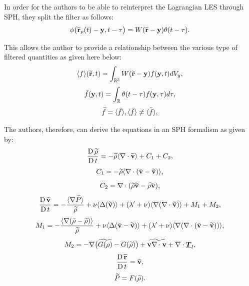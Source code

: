 In order for the authors to be able to reinterpret the Lagrangian LES through SPH, they split the filter as follows:
\begin{equation}
    \phi\big(\widetilde{\mathbf{r}}_p(t)-\mathbf{y}, t-\tau  \big) = W(\widetilde{\mathbf{r}} - \mathbf{y})\theta(t-\tau).
\end{equation}

This allows the author to provide a relationship between the various type of filtered quantities as given here below:
\begin{equation}
    \langle f \rangle(\widetilde{\mathbf{r}}, t) = \int_{\mathbb{R}^3} W ( \widetilde{\mathbf{r}} - \mathbf{y} ) f ( \mathbf{y}, t ) dV_y,
\end{equation}
\begin{equation}
    \bar{f}(\mathbf{y}, t) = \int_{\mathbb{R}} \theta(t-\tau) f(\mathbf{y}, \tau) d\tau,
\end{equation}
\begin{equation}
    \widetilde{f} = \langle \bar{f} \rangle, \langle \bar{f} \rangle \neq \bar{\langle f \rangle},
\end{equation}

The authors, therefore, can derive the equations in an SPH formalism as given by:
\begin{equation}
    \frac{\operatorname{D} \widetilde{\rho}}{\operatorname{D} t} = -\widetilde{\rho} \langle \nabla\cdot\widetilde{\mathbf{v}} \rangle + C_1 + C_2,
\end{equation}
\begin{equation}
    C_1 = -\widetilde{\rho}\langle \nabla\cdot(\bar{\mathbf{v}}-\widetilde{\mathbf{v}}) \rangle,
\end{equation}
\begin{equation}
    C_2 = \nabla\cdot(\widetilde{\rho}\widetilde{\mathbf{v}} - \widetilde{\rho\mathbf{v}}),
\end{equation}
\begin{equation}
    \frac{\operatorname{D} \widetilde{\mathbf{v}}}{\operatorname{D} t} = -\frac{\langle \nabla\widetilde{P} \rangle}{\widetilde{\rho}} + \nu\langle \Delta(\widetilde{\mathbf{v}}) \rangle + (\lambda'+\nu)\langle \nabla(\nabla\cdot\widetilde{\mathbf{v}}) \rangle + M_1 + M_2,
\end{equation}
\begin{equation}
    M_1 = -\frac{\langle \nabla(\bar{\rho}-\widetilde{\rho}) \rangle}{\widetilde{\rho}} + \nu\langle \Delta(\bar{\mathbf{v}}-\widetilde{\mathbf{v}}) \rangle + (\lambda'+\nu)\langle \nabla(\nabla\cdot(\bar{\mathbf{v}}-\widetilde{\mathbf{v}})) \rangle,
\end{equation}
\begin{equation}
    M_2 = -\nabla\big(\widetilde{G(\rho)}-G(\widetilde{\rho})\big) + \widetilde{\mathbf{v}\nabla\cdot\mathbf{v}} + \nabla\cdot\underline{\bm{T}}_l,
\end{equation}
\begin{equation}
    \frac{\operatorname{D} \widetilde{\mathbf{r}}}{\operatorname{D} t} = \widetilde{\mathbf{v}},
\end{equation}
\begin{equation}
    \widetilde{P}=F(\widetilde{\rho}).
\end{equation}

